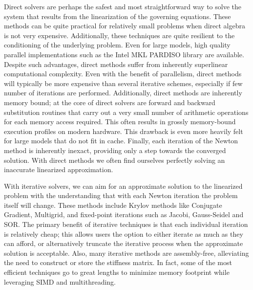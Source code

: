  Direct solvers are perhaps the safest and most straightforward way to
 solve the system that results from the linearization of the governing
 equations. These methods can be quite practical for relatively small
 problems when direct algebra is not very expensive. Additionally,
 these techniques are quite resilient to the conditioning of the
 underlying problem. Even for large models, high quality parallel
 implementations such as the Intel MKL PARDISO library are
 available. Despite such advantages, direct methods suffer from
 inherently superlinear computational complexity. Even with the
 benefit of parallelism, direct methods will typically be more
 expensive than several iterative schemes, especially if few number of
 iterations are performed. Additionally, direct methods are inherently
 memory bound; at the core of direct solvers are forward and backward
 substitution routines that carry out a very small number of
 arithmetic operations for each memory access required. This often
 results in grossly memory-bound execution profiles on modern
 hardware. This drawback is even more heavily felt for large models
 that do not fit in cache. Finally, each iteration of the Newton
 method is inherently inexact, providing only a step towards the
 converged solution. With direct methods we often find ourselves
 perfectly solving an inaccurate linearized approximation.

 With iterative solvers, we can aim for an approximate solution to the
 linearized problem with the understanding that with each Newton
 iteration the problem itself will change. These methods include
 Krylov methods like Conjugate Gradient, Multigrid, and fixed-point
 iterations such as Jacobi, Gauss-Seidel and SOR. The primary benefit
 of iterative techniques is that each individual iteration is
 relatively cheap; this allows users the option to either iterate as
 much as they can afford, or alternatively truncate the iterative
 process when the approximate solution is acceptable.  Also, many
 iterative methods are assembly-free, alleviating the need to
 construct or store the stiffness matrix.  In fact, some of the most
 efficient techniques go to great lengths to minimize memory footprint
 \cite{McAdaZSETTS:2011} while leveraging SIMD and multithreading.

